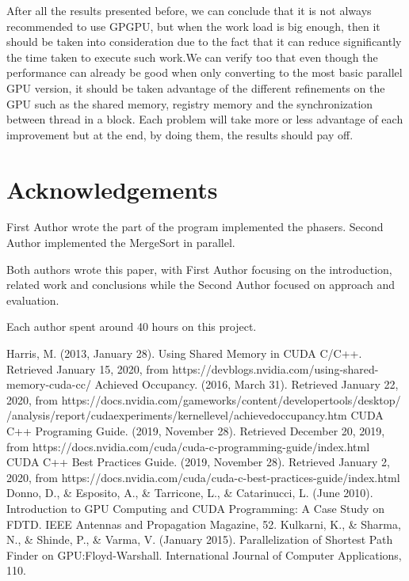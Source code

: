 \documentclass[conference]{IEEEtran}
\begin{document}
After all the results presented before, we can conclude that it is not always recommended to use GPGPU, but when the work load is big enough, then it should be taken into consideration due to the fact that it can reduce significantly the time taken to execute such work.We can verify too that even though the performance can already be good when only converting to the most basic parallel GPU version, it should be taken advantage of the different refinements on the GPU such as the shared memory, registry memory and the synchronization between thread in a block. Each problem will take more or less advantage of each improvement but at the end, by doing them, the results should pay off.

\section*{Acknowledgements}

First Author wrote the part of the program implemented the phasers. Second Author implemented the MergeSort in parallel. 

Both authors wrote this paper, with First Author focusing on the introduction, related work and conclusions while the Second Author focused on approach and evaluation.

Each author spent around 40 hours on this project.



\begin{thebibliography}{00}
	 Harris, M. (2013, January 28). Using Shared Memory in CUDA C/C++. Retrieved January 15, 2020, from https://devblogs.nvidia.com/using-shared-memory-cuda-cc/
	 Achieved Occupancy. (2016, March 31). Retrieved January 22, 2020, from https://docs.nvidia.com/gameworks/content/developertools/desktop/
	/analysis/report/cudaexperiments/kernellevel/achievedoccupancy.htm
	 CUDA C++ Programing Guide. (2019, November 28). Retrieved December 20, 2019, from https://docs.nvidia.com/cuda/cuda-c-programming-guide/index.html
	 CUDA C++ Best Practices Guide. (2019, November 28). Retrieved January 2, 2020, from https://docs.nvidia.com/cuda/cuda-c-best-practices-guide/index.html
	 Donno, D., \& Esposito, A., \& Tarricone, L., \& Catarinucci, L. (June 2010). Introduction to GPU Computing and CUDA Programming: A Case Study on FDTD. IEEE Antennas and Propagation Magazine, 52.  
	 Kulkarni, K., \& Sharma, N., \& Shinde, P., \& Varma, V. (January 2015). Parallelization of Shortest Path Finder on GPU:Floyd-Warshall. International Journal of Computer Applications, 110. 
\end{thebibliography}
\end{document}
